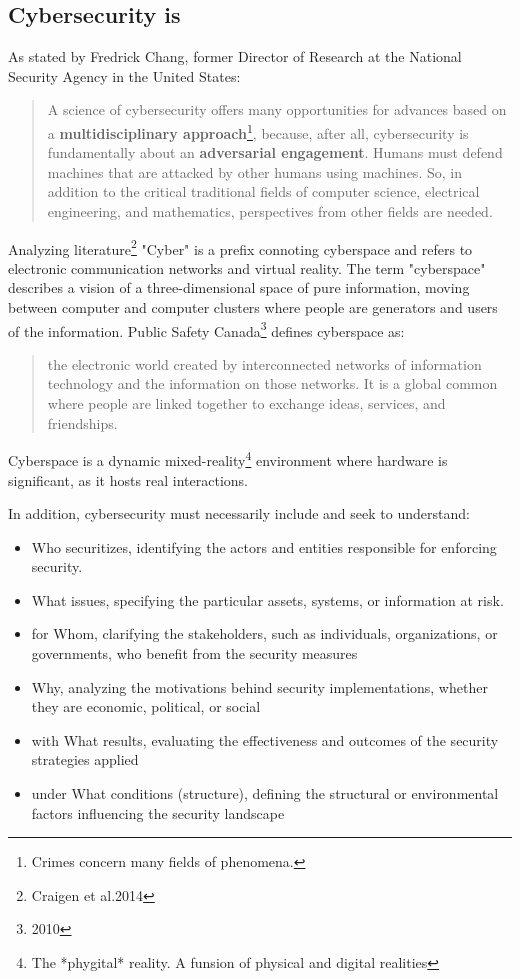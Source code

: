 \subsection{Cybersecurity is}

As stated by Fredrick Chang, former Director of Research at the National Security Agency in the United States:
\begin{quotation}
    A science of cybersecurity offers many opportunities for advances based on a \textbf{multidisciplinary approach}\footnote{Crimes concern many fields of phenomena.}, because, after all, cybersecurity is fundamentally about an \textbf{adversarial engagement}. Humans must defend machines that are attacked by other humans using machines. So, in addition to the critical traditional fields of computer science, electrical engineering, and mathematics, perspectives from other fields are needed.
\end{quotation}

Analyzing literature\footnote{Craigen et al.2014} "Cyber" is a prefix connoting cyberspace and refers to electronic communication networks and virtual reality.
The term "cyberspace" describes a vision of a three-dimensional space of pure information, moving between computer and computer clusters where people are generators and users of the information. Public Safety Canada\footnote{2010} defines cyberspace as:

\begin{quotation}
    the electronic world created by interconnected networks of information technology and the information on those networks. It is a global common where people are linked together to exchange ideas, services, and friendships.
\end{quotation} 

Cyberspace is a dynamic mixed-reality\footnote{The *phygital* reality. A funsion of physical and digital realities} environment where hardware is significant, as it hosts real interactions. 

\clearpage In addition, cybersecurity must necessarily include and seek to understand:
\begin{itemize}
    \item Who securitizes, identifying the actors and entities responsible for enforcing security.
    \item What issues, specifying the particular assets, systems, or information at risk.
    \item for Whom, clarifying the stakeholders, such as individuals, organizations, or governments, who benefit from the security measures
    \item Why, analyzing the motivations behind security implementations, whether they are economic, political, or social
    \item with What results, evaluating the effectiveness and outcomes of the security strategies applied
    \item under What conditions (structure), defining the structural or environmental factors influencing the security landscape
    \end{itemize}


